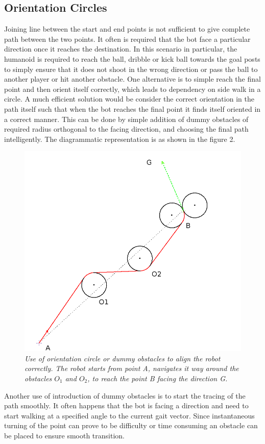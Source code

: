 \documentclass[letterpaper, 10 pt, conference]{ieeeconf}  %
\begin{document}
\subsection{Orientation Circles}
Joining line between the start and end points is not sufficient to give complete path between the two points. It often is required that the bot face a particular direction once it reaches the destination. In this scenario in particular, the humanoid is required to reach the ball, dribble or kick ball towards the goal posts to simply ensure that it does not shoot in the wrong direction or pass the ball to another player or hit another obstacle. One alternative is to simple reach the final point and then orient itself correctly, which leads to dependency on side walk in a circle. A much efficient solution would be consider the correct orientation in the path itself such that when the bot reaches the final point it finds itself oriented in a correct manner. This can be done by simple addition of dummy obstacles of required radius orthogonal to the facing direction, and choosing the final path intelligently. The diagrammatic representation is as shown in the figure 2. 
\begin{figure}[h]  
\begin{center}  
\includegraphics[scale=0.40]{orientation_circle2.JPG}  
\caption{\small \sl Use of orientation circle or dummy obstacles to align the robot correctly. The robot starts from point A, navigates it way around the obstacles $O_1$ and $O_2$, to reach the point B facing the direction G. \label{fig:orientation}}  
\end{center}  
\end{figure} 
Another use of introduction of dummy obstacles is to start the tracing of the path smoothly. It often happens that the bot is facing a direction and need to start walking at a specified angle to the current gait vector. Since instantaneous turning of the point can prove to be difficulty or time consuming an obstacle can be placed to ensure smooth transition.
\end{document}
